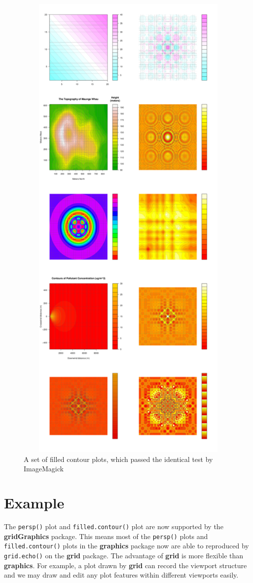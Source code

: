 \documentclass[11pt,twoside]{report}
\begin{document}
\begin{figure}[h]
	\begin{center}
		\includegraphics[height = 24cm, width = 12cm]{figure/montage/filled-contour-montage.png}
		\caption{A set of filled contour plots, which passed the identical test by ImageMagick}
		\label{chapter5.3}
	\end{center}
\end{figure}


\chapter{Example}
The \texttt{persp()} plot and \texttt{filled.contour()} plot are now supported by the \textbf{gridGraphics} package. This means most of the \texttt{persp()} plots and \texttt{filled.contour()} plots in the \textbf{graphics} package now are able to reproduced by \texttt{grid.echo()} on the \textbf{grid} package. The advantage of \textbf{grid} is more flexible than \textbf{graphics}. For example, a plot drawn by \textbf{grid} can record the viewport structure and we may draw and edit any plot features within different viewports easily.
\end{document}
